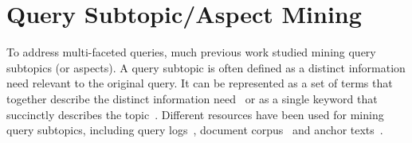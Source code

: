 \section{Query Subtopic/Aspect Mining}
To address multi-faceted queries, much previous work studied mining query subtopics (or aspects). 
A query subtopic is often defined as a distinct information need relevant to the original query.
It can be represented as a set of terms that together describe the distinct information need~\cite{wang2009mining,wu2011identifying, dang2011inferring} or as a single keyword that succinctly describes the topic~\cite{song2011overview}. 
Different resources have been used for mining query subtopics, including query logs~\cite{wang2007learn,hu2012mining,xue2011topic,wang2009mining,wu2011identifying,yin2010building}, document corpus~\cite{allan2002using} and anchor texts~\cite{dang2011inferring}.

